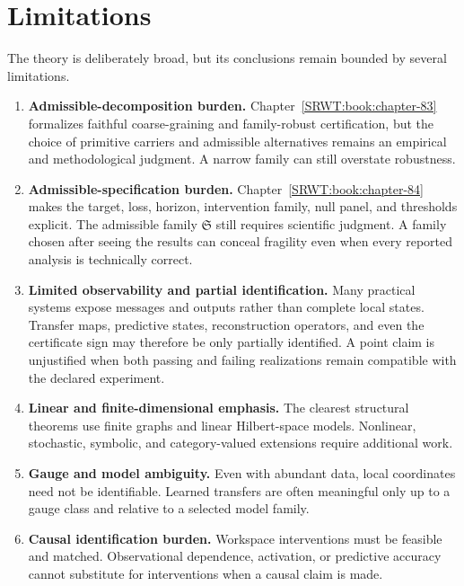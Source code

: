 \section{Limitations}

The theory is deliberately broad, but its conclusions remain bounded by several limitations.

\begin{enumerate}
\item \textbf{Admissible-decomposition burden.} Chapter~\ref{SRWT:book:chapter-83} formalizes faithful coarse-graining and
family-robust certification, but the choice of primitive carriers and admissible alternatives remains an
empirical and methodological judgment. A narrow family can still overstate robustness.

\item \textbf{Admissible-specification burden.} Chapter~\ref{SRWT:book:chapter-84} makes the target, loss, horizon,
intervention family, null panel, and thresholds explicit. The admissible family \(\mathfrak S\) still
requires scientific judgment. A family chosen after seeing the results can conceal fragility even when
every reported analysis is technically correct.

\item \textbf{Limited observability and partial identification.} Many practical systems expose messages
and outputs rather than complete local states. Transfer maps, predictive states, reconstruction operators,
and even the certificate sign may therefore be only partially identified. A point claim is unjustified
when both passing and failing realizations remain compatible with the declared experiment.

\item \textbf{Linear and finite-dimensional emphasis.} The clearest structural theorems use finite graphs
and linear Hilbert-space models. Nonlinear, stochastic, symbolic, and category-valued extensions require
additional work.

\item \textbf{Gauge and model ambiguity.} Even with abundant data, local coordinates need not be
identifiable. Learned transfers are often meaningful only up to a gauge class and relative to a selected
model family.

\item \textbf{Causal identification burden.} Workspace interventions must be feasible and matched.
Observational dependence, activation, or predictive accuracy cannot substitute for interventions when a
causal claim is made.


\end{enumerate}
